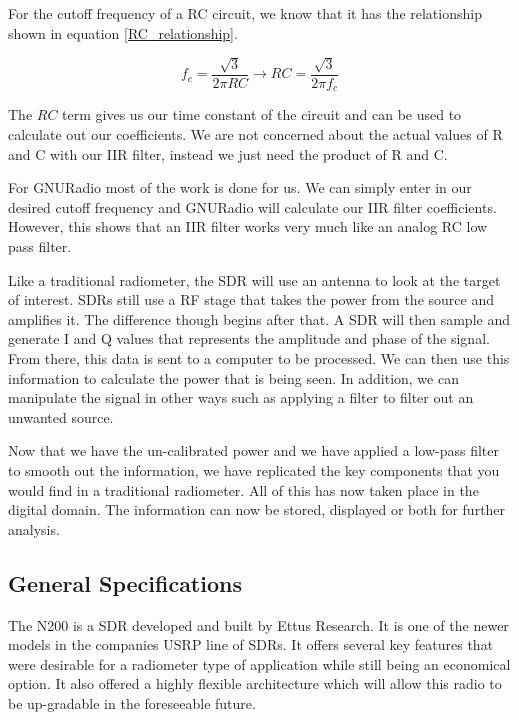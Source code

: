 For the cutoff frequency of a RC circuit, we know that it has the relationship shown in equation \ref{RC_relationship}.

\begin{equation}\label{RC_relationship}
f_c=\frac{\sqrt{3}}{2\pi RC}\rightarrow RC=\frac{\sqrt{3}}{2\pi f_c}
\end{equation}

The $RC$ term gives us our time constant of the circuit and can be used to calculate out our coefficients.  We are not concerned about the actual values of R and C with our IIR filter, instead we just need the product of R and C.  

For GNURadio most of the work is done for us.  We can simply enter in our desired cutoff frequency and GNURadio will calculate our IIR filter coefficients.  However, this shows that an IIR filter works very much like an analog RC low pass filter.

Like a traditional radiometer, the SDR will use an antenna to look at the target of interest.  SDRs still use a RF stage that takes the power from the source and amplifies it.  The difference though begins after that.  A SDR will then sample and generate I and Q values that represents the amplitude and phase of the signal.  From there, this data is sent to a computer to be processed.  We can then use this information to calculate the power that is being seen.  In addition, we can manipulate the signal in other ways such as applying a filter to filter out an unwanted source.

Now that we have the un-calibrated power and we have applied a low-pass filter to smooth out the information, we have replicated the key components that you would find in a traditional radiometer.  All of this has now taken place in the digital domain.  The information can now be stored, displayed or both for further analysis.  
\subsection{General Specifications}

The N200 is a SDR developed and built by Ettus Research.  It is one of the newer models in the companies USRP line of SDRs.  It offers several key features that were desirable for a radiometer type of application while still being an economical option.  It also offered a highly flexible architecture which will allow this radio to be up-gradable in the foreseeable future.  

